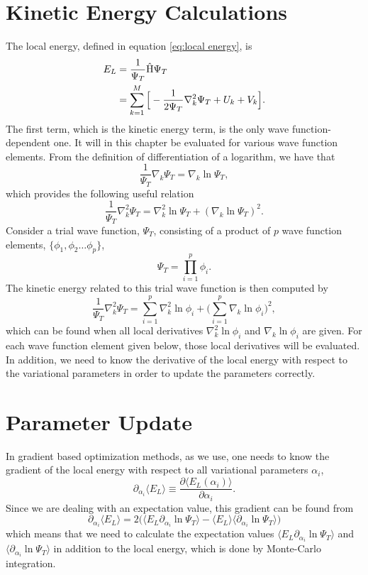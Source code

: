 \section{Kinetic Energy Calculations}
The local energy, defined in equation \eqref{eq:local energy}, is
\begin{align}
E_L &=\frac{1}{\Psi_T}\hat{\text{H}}\Psi_T\\
&=\sum_{k=1}^M\Big[-\frac{1}{2\Psi_T}\nabla_k^2\Psi_T + U_k + V_k\Big].
\end{align}
The first term, which is the kinetic energy term, is the only wave function-dependent one. It will in this chapter be evaluated for various wave function elements. From the definition of differentiation of a logarithm, we have that
\begin{equation}
\frac{1}{\Psi_T}\nabla_k\Psi_T=\nabla_k\ln\Psi_T,
\end{equation}
which provides the following useful relation 
\begin{equation}
\frac{1}{\Psi_T}\nabla_k^2\Psi_T=\nabla_k^2\ln\Psi_T + (\nabla_k\ln\Psi_T)^2.
\end{equation}
Consider a trial wave function, $\Psi_T$, consisting of a product of $p$ wave function elements, $\{\phi_1, \phi_2\hdots\phi_p\}$,
\begin{equation}
\Psi_T = \prod_{i=1}^p\phi_i.
\end{equation}
The kinetic energy related to this trial wave function is then computed by
\begin{equation}
\frac{1}{\Psi_T}\nabla_k^2\Psi_T=\sum_{i=1}^p\nabla_k^2\ln\phi_i + \Big(\sum_{i=1}^p\nabla_k\ln\phi_i\Big)^2,
\end{equation}
which can be found when all local derivatives $\nabla_k^2\ln\phi_i$ and $\nabla_k\ln\phi_i$ are given. For each wave function element given below, those local derivatives will be evaluated. In addition, we need to know the derivative of the local energy with respect to the variational parameters in order to update the parameters correctly. 

\section{Parameter Update}
In gradient based optimization methods, as we use, one needs to know the gradient of the local energy with respect to all variational parameters $\alpha_i$, 
\begin{equation}
\partial_{\alpha_i} \langle E_L\rangle\equiv\frac{\partial \langle E_L(\alpha_i)\rangle}{\partial \alpha_i}.
\end{equation}
Since we are dealing with an expectation value, this gradient can be found from
\begin{equation}
\partial_{\alpha_i} \langle E_L\rangle=2\Big(\langle E_L\partial_{\alpha_i}\ln\Psi_T\rangle - \langle E_L\rangle\langle\partial_{\alpha_i}\ln\Psi_T\rangle\Big)
\end{equation}
which means that we need to calculate the expectation values $\langle E_L\partial_{\alpha_i}\ln\Psi_T\rangle$ and $\langle\partial_{\alpha_i}\ln\Psi_T\rangle$ in addition to the local energy, which is done by Monte-Carlo integration. 

